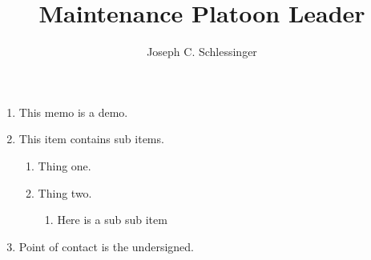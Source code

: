 \documentclass{/app/resources/latex/armymemo-notikz}
\author{Joseph C. Schlessinger}\rank{1LT}\branch{EN}
\title{Maintenance Platoon Leader}
\begin{document}
\begin{enumerate}
\item This memo is a demo.
\item This item contains sub items.
\begin{enumerate}
\item Thing one.
\item Thing two.
\begin{enumerate}
\item Here is a sub sub item
\end{enumerate}
\end{enumerate}
\item Point of contact is the undersigned.
\end{enumerate}
\end{document}
